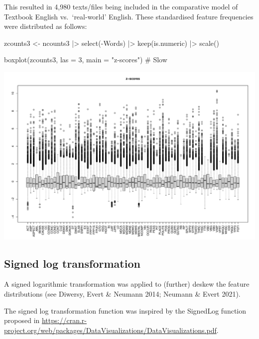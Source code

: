 \documentclass[
  letterpaper,
  DIV=11,
  numbers=noendperiod]{scrreprt}
\newenvironment{Shaded}{\begin{snugshade}}{\end{snugshade}}
\newcommand{\AttributeTok}[1]{\textcolor[rgb]{0.40,0.45,0.13}{#1}}
\newcommand{\CommentTok}[1]{\textcolor[rgb]{0.37,0.37,0.37}{#1}}
\newcommand{\DecValTok}[1]{\textcolor[rgb]{0.68,0.00,0.00}{#1}}
\newcommand{\FunctionTok}[1]{\textcolor[rgb]{0.28,0.35,0.67}{#1}}
\newcommand{\NormalTok}[1]{\textcolor[rgb]{0.00,0.23,0.31}{#1}}
\newcommand{\OtherTok}[1]{\textcolor[rgb]{0.00,0.23,0.31}{#1}}
\newcommand{\SpecialCharTok}[1]{\textcolor[rgb]{0.37,0.37,0.37}{#1}}
\newcommand{\StringTok}[1]{\textcolor[rgb]{0.13,0.47,0.30}{#1}}
\begin{document}
This resulted in 4,980 texts/files being included in the comparative
model of Textbook English vs.~`real-world' English. These standardised
feature frequencies were distributed as follows:

\begin{Shaded}
\begin{Highlighting}[]
\NormalTok{zcounts3 }\OtherTok{\textless{}{-}}\NormalTok{ ncounts3 }\SpecialCharTok{|\textgreater{}}
  \FunctionTok{select}\NormalTok{(}\SpecialCharTok{{-}}\NormalTok{Words) }\SpecialCharTok{|\textgreater{}} 
  \FunctionTok{keep}\NormalTok{(is.numeric) }\SpecialCharTok{|\textgreater{}} 
  \FunctionTok{scale}\NormalTok{()}

\FunctionTok{boxplot}\NormalTok{(zcounts3, }\AttributeTok{las =} \DecValTok{3}\NormalTok{, }\AttributeTok{main =} \StringTok{"z{-}scores"}\NormalTok{) }\CommentTok{\# Slow}
\end{Highlighting}
\end{Shaded}

\includegraphics{AppendixG_files/figure-pdf/z-transformed-distributions-1.pdf}

\subsection{Signed log
transformation}\label{signed-log-transformation-1}

A signed logarithmic transformation was applied to (further) deskew the
feature distributions (see Diwersy, Evert \& Neumann 2014; Neumann \&
Evert 2021).

The signed log transformation function was inspired by the SignedLog
function proposed in
\url{https://cran.r-project.org/web/packages/DataVisualizations/DataVisualizations.pdf}.
\end{document}
